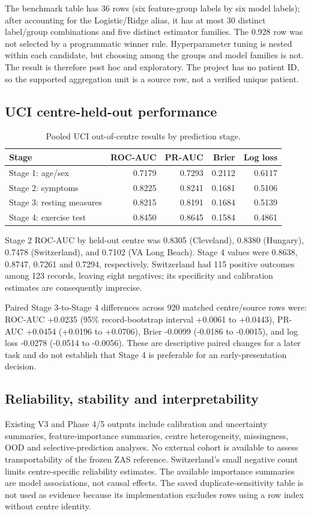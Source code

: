 \documentclass[11pt]{article}
\begin{document}
The benchmark table has 36 rows (six feature-group labels by six model labels); after accounting for the Logistic/Ridge alias, it has at most 30 distinct label/group combinations and five distinct estimator families. The 0.928 row was not selected by a programmatic winner rule. Hyperparameter tuning is nested within each candidate, but choosing among the groups and model families is not. The result is therefore post hoc and exploratory. The project has no patient ID, so the supported aggregation unit is a source row, not a verified unique patient.

\subsection{UCI centre-held-out performance}
\begin{table}[ht]
\centering
\caption{Pooled UCI out-of-centre results by prediction stage.}
\begin{tabular}{lrrrr}
\toprule
Stage & ROC-AUC & PR-AUC & Brier & Log loss\\
\midrule
Stage 1: age/sex & 0.7179 & 0.7293 & 0.2112 & 0.6117\\
Stage 2: symptoms & 0.8225 & 0.8241 & 0.1681 & 0.5106\\
Stage 3: resting measures & 0.8215 & 0.8191 & 0.1684 & 0.5139\\
Stage 4: exercise test & 0.8450 & 0.8645 & 0.1584 & 0.4861\\
\bottomrule
\end{tabular}
\end{table}

Stage 2 ROC-AUC by held-out centre was 0.8305 (Cleveland), 0.8380 (Hungary), 0.7478 (Switzerland), and 0.7102 (VA Long Beach). Stage 4 values were 0.8638, 0.8747, 0.7261 and 0.7294, respectively. Switzerland had 115 positive outcomes among 123 records, leaving eight negatives; its specificity and calibration estimates are consequently imprecise.

Paired Stage 3-to-Stage 4 differences across 920 matched centre/source rows were: ROC-AUC +0.0235 (95\% record-bootstrap interval +0.0061 to +0.0443), PR-AUC +0.0454 (+0.0196 to +0.0706), Brier -0.0099 (-0.0186 to -0.0015), and log loss -0.0278 (-0.0514 to -0.0056). These are descriptive paired changes for a later task and do not establish that Stage 4 is preferable for an early-presentation decision.

\subsection{Reliability, stability and interpretability}
Existing V3 and Phase 4/5 outputs include calibration and uncertainty summaries, feature-importance summaries, centre heterogeneity, missingness, OOD and selective-prediction analyses. No external cohort is available to assess transportability of the frozen ZAS reference. Switzerland's small negative count limits centre-specific reliability estimates. The available importance summaries are model associations, not causal effects. The saved duplicate-sensitivity table is not used as evidence because its implementation excludes rows using a row index without centre identity.
\end{document}
